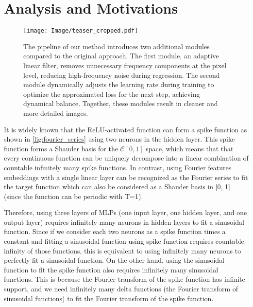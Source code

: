 \section{Analysis and Motivations}
\begin{figure*}[!ht]
    \centering\texttt{[image: Image/teaser\_cropped.pdf]}
    \caption{The pipeline of our method introduces two additional modules compared to the original approach. The first module, an adaptive linear filter, removes unnecessary frequency components at the pixel level, reducing high-frequency noise during regression. The second module dynamically adjusts the learning rate during training to optimize the approximated loss for the next step, achieving dynamical balance. Together, these modules result in cleaner and more detailed images.}
    \label{fig:T}
   \vspace{-10pt} 
\end{figure*}
It is widely known that the ReLU-activated function can form a spike function as shown in \autoref{fig:fourier_series} using two neurons in the hidden layer. This spike function forms a Shauder basis for the $\mathcal{C}[0,1]$ space, which means that that every continuous function can be uniquely decompose into a linear combination of countable infinitely many spike functions. In contrast, using Fourier features embeddings with a single linear layer can be recognized as the Fourier series to fit the target function which can also be considered as a Shauder basis in [0, 1] (since the function can be periodic with T=1).

Therefore, using three layers of MLPs (one input layer, one hidden layer, and one output layer) requires infinitely many neurons in hidden layers to fit a sinusoidal function. Since if we consider each two neurons as a spike function times a constant and fitting a sinusoidal function using spike function requires countable infinity of those functions, this is equivalent to using infinitely many neurons to perfectly fit a sinusoidal function. On the other hand, using the sinusoidal function to fit the spike function also requires infinitely many sinusoidal functions. This is because the Fourier transform of the spike function has infinite support, and we need infinitely many delta functions (the Fourier transform of sinusoidal functions) to fit the Fourier transform of the spike function.

